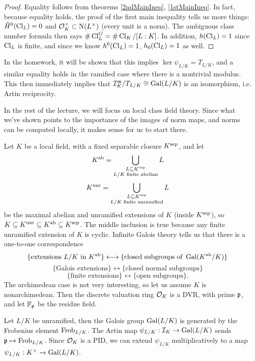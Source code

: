 \documentclass[11pt]{amsart}
\begin{document}
\begin{proof}
Equality follows from theorems \ref{2ndMainIneq}, \ref{1stMainIneq}. In fact, because equality holds, the proof of the first main inequality tells us more things: $\hat{H}^0(\operatorname{Cl}_L) = 0$ and $\mathcal{O}_K^\times \subset \operatorname{N}(L^\times)$ (every unit is a norm). The ambiguous class number formula then says $\# \operatorname{Cl}_L^G = \# \operatorname{Cl}_K/[L:K]$. In addition, $h(\operatorname{Cl}_L) = 1$ since $\operatorname{Cl}_L$ is finite, and since we know $h^0(\operatorname{Cl}_L) = 1$, $h_0(\operatorname{Cl}_L) = 1$ as well.
\end{proof}

In the homework, it will be shown that this implies $\ker\psi_{L/K} = T_{L/K}$, and a similar equality holds in the ramified case where there is a nontrivial modulus. This then immediately implies that $\mathcal{I}_K^{\mathfrak{m}}/T_{L/K} \cong \operatorname{Gal}(L/K)$ is an isomorphism, i.e. Artin reciprocity.

In the rest of the lecture, we will focus on local class field theory. Since what we've shown points to the importance of the images of norm maps, and norms can be computed locally, it makes sense for us to start there.

Let $K$ be a local field, with a fixed separable closure $K^{\operatorname{sep}}$, and let
\[K^{\operatorname{ab}} = \bigcup_{\substack{L\subseteq K^{\operatorname{sep}} \\ L/K\text{ finite abelian}}} L\]
\[K^{\operatorname{unr}} = \bigcup_{\substack{L\subseteq K^{\operatorname{sep}} \\ L/K\text{ finite unramified}}} L\]
be the maximal abelian and unramified extensions of $K$ (inside $K^{\operatorname{sep}}$), so $K \subseteq K^{\operatorname{unr}} \subseteq K^{\operatorname{ab}} \subseteq K^{\operatorname{sep}}$. The middle inclusion is true because any finite unramified extension of $K$ is cyclic. Infinite Galois theory tells us that there is a one-to-one correspondence
\[\{\text{extensions } L/K \text{ in } K^{\operatorname{ab}}\} \longleftrightarrow \{\text{closed subgroups of } \operatorname{Gal}(K^{\operatorname{ab}}/K)\}\]
\[\{\text{Galois extensions}\} \longleftrightarrow \{\text{closed normal subgroups}\}\]
\[\{\text{finite extensions}\} \longleftrightarrow \{\text{open subgroups}\}.\]
The archimedean case is not very interesting, so let us assume $K$ is nonarchimedean. Then the discrete valuation ring $\mathcal{O}_K$ is a DVR, with prime $\mathfrak{p}$, and let $\mathbb{F}_{\mathfrak{p}}$ be the residue field. 

Let $L/K$ be unramified, then the Galois group $\operatorname{Gal}(L/K)$ is generated by the Frobenius element $\operatorname{Frob}_{L/K}$. The Artin map $\psi_{L/K}: \mathcal{I}_K\to \operatorname{Gal}(L/K)$ sends $\mathfrak{p} \mapsto \operatorname{Frob}_{L/K}$. Since $\mathcal{O}_K$ is a PID, we can extend $\psi_{L/K}$ multiplicatively to a map $\psi_{L/K}: K^\times \to \operatorname{Gal}(L/K)$.
\end{document}

